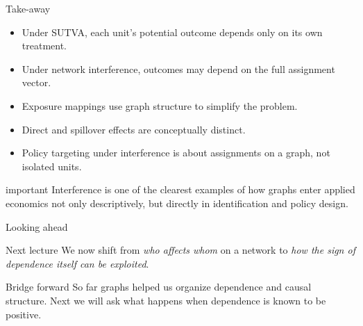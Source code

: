 \documentclass[dvipsnames,aspectratio=169,handout]{beamer}
\begin{document}
\begin{frame}{Take-away}
\begin{itemize}
    \item Under SUTVA, each unit's potential outcome depends only on its own treatment.
    \item Under network interference, outcomes may depend on the full assignment vector.
    \item Exposure mappings use graph structure to simplify the problem.
    \item Direct and spillover effects are conceptually distinct.
    \item Policy targeting under interference is about assignments on a graph, not isolated units.
\end{itemize}

\vspace{2mm}
\begin{beamercolorbox}[wd=\textwidth,sep=8pt,center,rounded=true,shadow=true]{important}
Interference is one of the clearest examples of how graphs enter applied economics not only descriptively, but directly in identification and policy design.
\end{beamercolorbox}
\end{frame}

\begin{frame}{Looking ahead}
\begin{block}{Next lecture}
We now shift from \emph{who affects whom} on a network to \emph{how the sign of dependence itself can be exploited}.
\end{block}

\begin{alertblock}{Bridge forward}
So far graphs helped us organize dependence and causal structure.
Next we will ask what happens when dependence is known to be positive.
\end{alertblock}
\end{frame}
\end{document}
